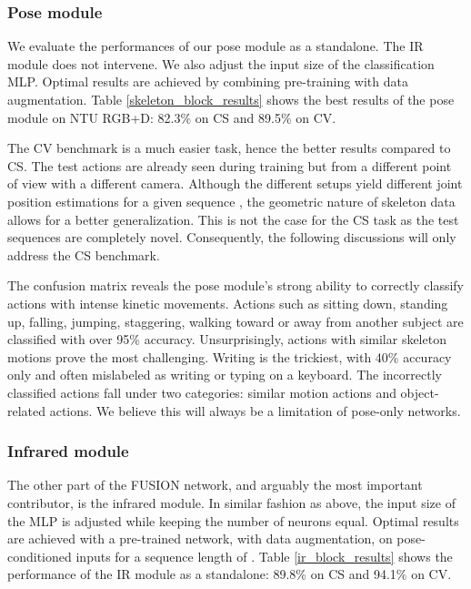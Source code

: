 \documentclass[letterpaper, 10 pt, conference]{ieeeconf}
\begin{document}
\subsubsection{Pose module}

We evaluate the performances of our pose module as a standalone. The IR module does not intervene. We also adjust the input size of the classification MLP. Optimal results are achieved by combining pre-training with data augmentation. Table \ref{skeleton_block_results} shows the best results of the pose module on NTU RGB+D: 82.3\% on CS and 89.5\% on CV. 

The CV benchmark is a much easier task, hence the better results compared to CS. The test actions are already seen during training but from a different point of view with a different camera. Although the different setups yield different joint position estimations for a given sequence \cite{zhang2019view}, the geometric nature of skeleton data allows for a better generalization. This is not the case for the CS task as the test sequences are completely novel. Consequently, the following discussions will only address the CS benchmark.

The confusion matrix reveals the pose module's strong ability to correctly classify actions with intense kinetic movements. Actions such as sitting down, standing up, falling, jumping, staggering, walking toward or away from another subject are classified with over 95\% accuracy. Unsurprisingly, actions with similar skeleton motions prove the most challenging. Writing is the trickiest, with 40\% accuracy only and often mislabeled as writing or typing on a keyboard. The incorrectly classified actions fall under two categories: similar motion actions and object-related actions. We believe this will always be a limitation of pose-only networks.

\subsubsection{Infrared module}

The other part of the FUSION network, and arguably the most important contributor, is the infrared module. In similar fashion as above, the input size of the MLP is adjusted while keeping the number of neurons equal. Optimal results are achieved with a pre-trained network, with data augmentation, on pose-conditioned inputs for a sequence length of . Table \ref{ir_block_results} shows the performance of the IR module as a standalone: 89.8\% on CS and 94.1\% on CV. 
\end{document}
